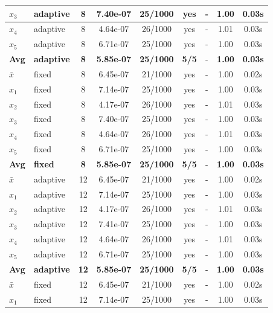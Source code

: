 \begin{longtable}{|l|l|c|c|c|c|c|c|c|}
\hline
$x_3$ & adaptive & 8 & 7.40e-07 & 25/1000 & yes & - & 1.00 & 0.03s \\
\hline
$x_4$ & adaptive & 8 & 4.64e-07 & 26/1000 & yes & - & 1.01 & 0.03s \\
\hline
$x_5$ & adaptive & 8 & 6.71e-07 & 25/1000 & yes & - & 1.00 & 0.03s \\
\hline
\hline\hline
\textbf{Avg} & \textbf{adaptive} & \textbf{8} & \textbf{5.85e-07} & \textbf{25/1000} & \textbf{5/5} & - & \textbf{1.00} & \textbf{0.03s} \\
\hline\hline
\hline
$\bar{x}$ & fixed & 8 & 6.45e-07 & 21/1000 & yes & - & 1.00 & 0.02s \\
\hline
$x_1$ & fixed & 8 & 7.14e-07 & 25/1000 & yes & - & 1.00 & 0.03s \\
\hline
$x_2$ & fixed & 8 & 4.17e-07 & 26/1000 & yes & - & 1.01 & 0.03s \\
\hline
$x_3$ & fixed & 8 & 7.40e-07 & 25/1000 & yes & - & 1.00 & 0.03s \\
\hline
$x_4$ & fixed & 8 & 4.64e-07 & 26/1000 & yes & - & 1.01 & 0.03s \\
\hline
$x_5$ & fixed & 8 & 6.71e-07 & 25/1000 & yes & - & 1.00 & 0.03s \\
\hline
\hline\hline
\textbf{Avg} & \textbf{fixed} & \textbf{8} & \textbf{5.85e-07} & \textbf{25/1000} & \textbf{5/5} & - & \textbf{1.00} & \textbf{0.03s} \\
\hline\hline
$\bar{x}$ & adaptive & 12 & 6.45e-07 & 21/1000 & yes & - & 1.00 & 0.02s \\
\hline
$x_1$ & adaptive & 12 & 7.14e-07 & 25/1000 & yes & - & 1.00 & 0.03s \\
\hline
$x_2$ & adaptive & 12 & 4.17e-07 & 26/1000 & yes & - & 1.01 & 0.03s \\
\hline
$x_3$ & adaptive & 12 & 7.41e-07 & 25/1000 & yes & - & 1.00 & 0.03s \\
\hline
$x_4$ & adaptive & 12 & 4.64e-07 & 26/1000 & yes & - & 1.01 & 0.03s \\
\hline
$x_5$ & adaptive & 12 & 6.71e-07 & 25/1000 & yes & - & 1.00 & 0.03s \\
\hline
\hline\hline
\textbf{Avg} & \textbf{adaptive} & \textbf{12} & \textbf{5.85e-07} & \textbf{25/1000} & \textbf{5/5} & - & \textbf{1.00} & \textbf{0.03s} \\
\hline\hline
\hline
$\bar{x}$ & fixed & 12 & 6.45e-07 & 21/1000 & yes & - & 1.00 & 0.02s \\
\hline
$x_1$ & fixed & 12 & 7.14e-07 & 25/1000 & yes & - & 1.00 & 0.03s \\

\end{longtable}
